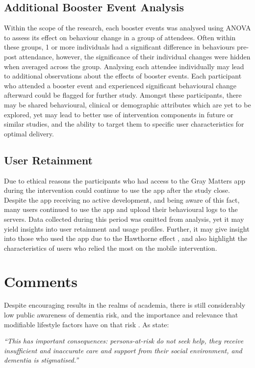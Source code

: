 \subsection{Additional Booster Event Analysis}
Within the scope of the research, each booster events was analysed using ANOVA to assess its effect on behaviour change in a group of attendees. Often within these groups, 1 or more individuals had a significant difference in behaviours pre-post attendance, however, the significance of their individual changes were hidden when averaged across the group.
Analysing each attendee individually may lead to additional observations about the effects of booster events. Each participant who attended a booster event and experienced significant behavioural change afterward could be flagged for further study. Amongst these participants, there may be shared behavioural, clinical or demographic attributes which are yet to be explored, yet may lead to better use of intervention components in future or similar studies, and the ability to target them to specific user characteristics for optimal delivery.

\subsection{User Retainment}
Due to ethical reasons the participants who had access to the Gray Matters app during the intervention could continue to use the app after the study close. Despite the app receiving no active development, and being aware of this fact, many users continued to use the app and upload their behavioural logs to the servers. Data collected during this period was omitted from analysis, yet it may yield insights into user retainment and usage profiles. Further, it may give insight into those who used the app due to the Hawthorne effect \cite{McCarney2007}, and also highlight the characteristics of users who relied the most on the mobile intervention.

\section{Comments}
Despite encouraging results in the realms of academia, there is still considerably low public awareness of dementia risk, and the importance and relevance that modifiable lifestyle factors have on that risk \cite{FarrowM2008}. As \citeauthor{Deckers2015} state:
\begin{displayquote}
\textit{``This has important consequences: persons-at-risk do not seek help, they receive insufficient and inaccurate care and support from their social environment, and dementia is stigmatised.''} \cite{Deckers2015}
\end{displayquote}

